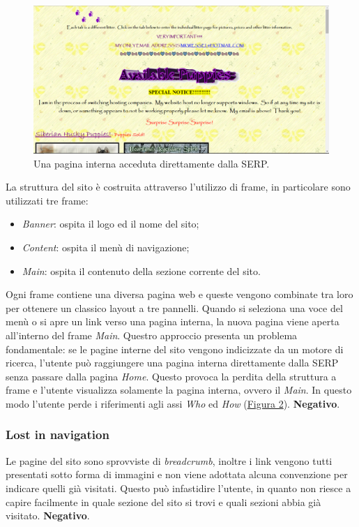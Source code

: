 \documentclass[../rapporto-usabilita.tex]{subfiles}
\begin{document}
			\begin{figure}[!h]
			\centering
				\includegraphics[scale=0.33]{immagini/nursery.png}
				\caption{Una pagina interna acceduta direttamente dalla SERP.}
				\label{fig:innerpage}
			\end{figure}			
		
		La struttura del sito è costruita attraverso l'utilizzo di frame, in particolare sono utilizzati tre frame:
		
		\begin{itemize}
			\item \textit{Banner}: ospita il logo ed il nome del sito;
			
			\item \textit{Content}: ospita il menù di navigazione;
			
			\item \textit{Main}: ospita il contenuto della sezione corrente del sito.
		\end{itemize}
		
		Ogni frame contiene una diversa pagina web e queste vengono combinate tra loro per ottenere un classico layout a tre pannelli.
		Quando si seleziona una voce del menù o si apre un link verso una pagina interna, la nuova pagina viene aperta all'interno del frame \textit{Main}.
	Questro approccio presenta un problema fondamentale: se le pagine interne del sito vengono indicizzate da un motore di ricerca, l'utente può raggiungere una pagina interna direttamente dalla SERP senza passare dalla pagina \textit{Home}. Questo provoca la perdita della struttura a frame e l'utente visualizza solamente la pagina interna, ovvero il \textit{Main}. In questo modo l'utente perde i riferimenti agli assi \textit{Who} ed \textit{How} (\hyperref[fig:innerpage]{Figura 2}). \textbf{Negativo}.
	
		\subsubsection{Lost in navigation}
			Le pagine del sito sono sprovviste di \textit{breadcrumb}, inoltre i link vengono tutti presentati sotto forma di immagini e non viene adottata alcuna convenzione per indicare quelli già visitati. Questo può infastidire l'utente, in quanto non riesce a capire facilmente in quale sezione del sito si trovi e quali sezioni abbia già visitato. \textbf{Negativo}.
			
\end{document}
